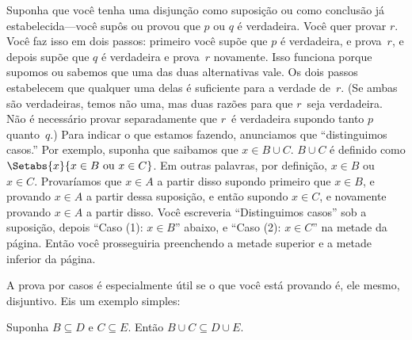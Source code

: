 \documentclass[../../../include/open-logic-section]{subfiles}
\begin{document}
Suponha que você tenha uma disjunção como suposição ou como conclusão já
estabelecida---você supôs ou provou que $p$ ou $q$ é
verdadeira.  Você quer provar $r$.  Você faz isso em dois passos: primeiro você
supõe que $p$ é verdadeira, e prova~$r$, e depois supõe que $q$ é
verdadeira e prova~$r$ novamente.  Isso funciona porque supomos ou sabemos que
uma das duas alternativas vale. Os dois passos estabelecem que qualquer
uma delas é suficiente para a verdade de~$r$.  (Se ambas são verdadeiras, temos
não uma, mas duas razões para que $r$~seja verdadeira. Não é necessário
provar separadamente que $r$~é verdadeira supondo tanto $p$ quanto~$q$.)  Para
indicar o que estamos fazendo, anunciamos que ``distinguimos casos.''
Por exemplo, suponha que saibamos que $x \in B \cup C$.  $B \cup C$ é
definido como $\Setabs{x}{x \in B \text{ ou } x \in C}$. Em outras palavras,
por definição, $x \in B$ ou $x \in C$. Provaríamos que $x \in A$
a partir disso supondo primeiro que $x \in B$, e provando $x \in A$ a partir
dessa suposição, e então supondo $x \in C$, e novamente provando $x \in A$
a partir disso.  Você escreveria ``Distinguimos casos'' sob a
suposição, depois ``Caso (1): $x \in B$'' abaixo, e ``Caso (2):
$x \in C$'' na metade da página. Então você prosseguiria preenchendo a metade
superior e a metade inferior da página.

A prova por casos é especialmente útil se o que você está provando é, ele mesmo,
disjuntivo. Eis um exemplo simples:

\begin{prop}
Suponha $B \subseteq D$ e $C \subseteq E$. Então $B \cup C \subseteq
D \cup E$.
\end{prop}
\end{document}
